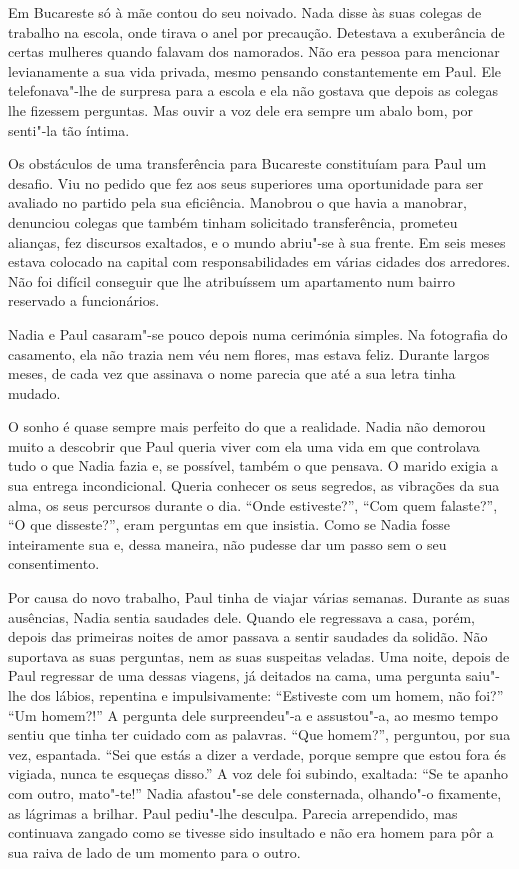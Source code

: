 Em Bucareste só à mãe contou do seu
noivado. Nada disse às suas colegas de trabalho na escola, onde tirava o
anel por precaução. Detestava a exuberância de certas mulheres quando
falavam dos namorados. Não era pessoa para mencionar levianamente a sua
vida privada, mesmo pensando constantemente em Paul. Ele telefonava"-lhe
de surpresa para a escola e ela não gostava que depois as colegas lhe
fizessem perguntas. Mas ouvir a voz dele era
sempre um abalo bom, por senti"-la tão íntima.

Os obstáculos de uma transferência para Bucareste constituíam para Paul
um desafio. Viu no pedido que fez
aos seus superiores uma oportunidade para ser avaliado no partido pela
sua eficiência. Manobrou o que havia a manobrar, denunciou colegas que
também tinham solicitado transferência, prometeu alianças, fez
discursos exaltados, e o mundo abriu"-se à sua frente. Em seis meses
estava colocado na capital com responsabilidades em várias cidades dos
arredores. Não foi difícil conseguir que lhe atribuíssem um apartamento
num bairro reservado a funcionários.

Nadia e Paul casaram"-se pouco depois numa cerimónia simples. Na
fotografia do casamento, ela não trazia nem véu nem flores, mas estava
feliz. Durante largos meses, de cada vez que assinava o nome parecia que
até a sua letra tinha mudado.

O sonho é quase sempre mais perfeito do que a realidade. Nadia não
demorou muito a descobrir que Paul queria viver com ela uma vida em que
controlava tudo o que Nadia fazia e, se possível, também o que pensava.
O marido exigia a sua entrega incondicional. Queria conhecer os seus
segredos, as vibrações da sua alma, os seus percursos durante o dia.
``Onde estiveste?'', ``Com quem falaste?'', ``O que disseste?'', eram
perguntas em que insistia. Como se Nadia fosse inteiramente sua e,
dessa maneira, não pudesse dar um passo sem o seu consentimento.

Por causa do novo trabalho, Paul tinha de viajar várias semanas. Durante
as suas ausências, Nadia sentia saudades dele. Quando ele regressava a
casa, porém, depois das primeiras noites de amor passava a sentir
saudades da solidão. Não suportava as suas perguntas, nem as suas
suspeitas veladas. Uma noite, depois de Paul regressar de
uma dessas viagens, já deitados na cama, uma pergunta saiu"-lhe dos
lábios, repentina e impulsivamente: ``Estiveste com um homem, não foi?''
``Um homem?!'' A pergunta dele surpreendeu"-a e assustou"-a, ao mesmo tempo
sentiu que tinha ter cuidado com as palavras. ``Que homem?'', perguntou,
por sua vez, espantada. ``Sei que estás a dizer a verdade, porque sempre
que estou fora és vigiada, nunca te esqueças disso.'' A voz dele foi
subindo, exaltada: ``Se te apanho com outro, mato"-te!'' Nadia afastou"-se
dele consternada, olhando"-o fixamente, as lágrimas a brilhar. Paul
pediu"-lhe desculpa. Parecia arrependido, mas continuava zangado como se
tivesse sido insultado e não era homem para pôr a sua raiva de lado de
um momento para o outro.

